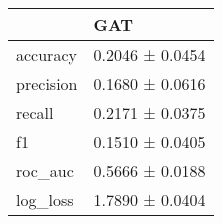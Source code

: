 \begin{tabular}{ll}
\toprule
 & GAT \\
\midrule
accuracy & 0.2046 ± 0.0454 \\
precision & 0.1680 ± 0.0616 \\
recall & 0.2171 ± 0.0375 \\
f1 & 0.1510 ± 0.0405 \\
roc_auc & 0.5666 ± 0.0188 \\
log_loss & 1.7890 ± 0.0404 \\
\bottomrule
\end{tabular}
